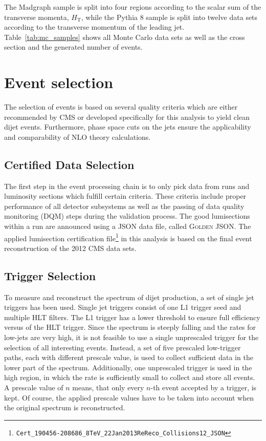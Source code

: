 The Madgraph sample is split into four regions according to the scalar sum of
the transverse momenta, $H_{\mathrm{T}}$, while the Pythia 8 sample is split
into twelve data sets according to the transverse momentum of the leading jet.
Table~\ref{tab:mc_samples} shows all Monte Carlo data sets as well as the cross
section and the generated number of events.

\section{Event selection}
\label{sec:event_selection}

The selection of events is based on several quality criteria which are either
recommended by CMS or developed specifically for this analysis to yield clean
dijet events.  Furthermore, phase space cuts on the jets ensure the
applicability and comparability of NLO theory calculations.

\subsection{Certified Data Selection}

The first step in the event processing chain is to only pick data from runs and
luminosity sections which fulfill certain criteria. These criteria include
proper performance of all detector subsystems as well as the passing of data
quality monitoring (DQM) steps during the validation process. The good
lumisections within a run are announced using a JSON data file, called
\textsc{Golden JSON}. The applied lumisection certification
file\footnote{\texttt{Cert\_190456-208686\_8TeV\_22Jan2013ReReco\_Collisions12\_JSON}}
in this analysis is based on the final event reconstruction of the 2012 CMS data
sets.

\subsection{Trigger Selection}

To measure and reconstruct the \ptavg spectrum of dijet production, a set of
single jet triggers has been used. Single jet triggers consist of one L1 trigger
seed and multiple HLT filters. The L1 trigger has a lower threshold to ensure
full efficiency versus \pt of the HLT trigger. Since the \pt spectrum is steeply
falling and the rates for low-\pt jets are very high, it is not feasible to use
a single unprescaled trigger for the selection of all interesting events.
Instead, a set of five prescaled low-\pt trigger paths, each with different
prescale value, is used to collect sufficient data in the lower part of the \pt
spectrum.  Additionally, one unprescaled trigger is used in the high \pt region, in
which the rate is sufficiently small to collect and store all
events. A prescale value of $n$ means, that only every $n$-th event accepted by
a trigger, is kept. Of course, the applied prescale values have to be taken into
account when the original spectrum is reconstructed. 

